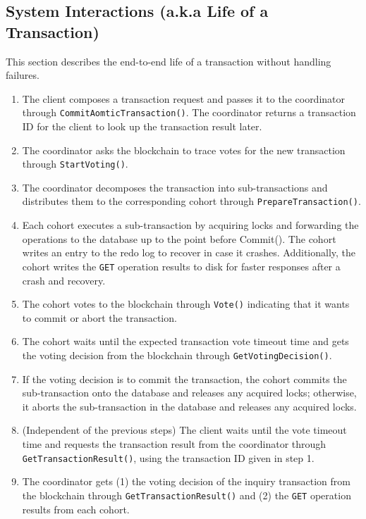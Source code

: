 \documentclass[11pt,conference]{IEEEtran}
\begin{document}
\subsection{System Interactions (a.k.a Life of a Transaction)} \label{txnflow}

This section describes the end-to-end life of a transaction without handling failures.

\begin{enumerate}
  \item The client composes a transaction request and passes it to the coordinator through \texttt{CommitAomticTransaction()}. The coordinator returns a transaction ID for the client to look up the transaction result later.
  \item The coordinator asks the blockchain to trace votes for the new transaction through \texttt{StartVoting()}.
  \item The coordinator decomposes the transaction into sub-transactions and distributes them to the corresponding cohort through \texttt{PrepareTransaction()}.
  \item Each cohort executes a sub-transaction by acquiring locks and forwarding the operations to the database up to the point before Commit(). The cohort writes an entry to the redo log to recover in case it crashes. Additionally, the cohort writes the \texttt{GET} operation results to disk for faster responses after a crash and recovery.
  \item The cohort votes to the blockchain through \texttt{Vote()} indicating that it wants to commit or abort the transaction.
  \item The cohort waits until the expected transaction vote timeout time and gets the voting decision from the blockchain through \texttt{GetVotingDecision()}.
  \item If the voting decision is to commit the transaction, the cohort commits the sub-transaction onto the database and releases any acquired locks; otherwise, it aborts the sub-transaction in the database and releases any acquired locks.
  \item (Independent of the previous steps) The client waits until the vote timeout time and requests the transaction result from the coordinator through \texttt{GetTransactionResult()}, using the transaction ID given in step 1.
  \item The coordinator gets (1) the voting decision of the inquiry transaction from the blockchain through \texttt{GetTransactionResult()} and (2) the \texttt{GET} operation results from each cohort.
\end{enumerate}
\end{document}
